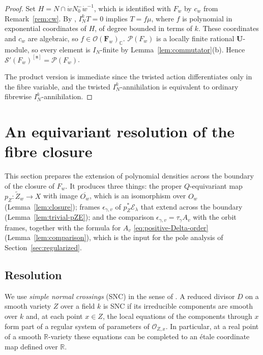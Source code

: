 \documentclass[a4paper,12pt]{amsart}
\numberwithin{equation}{section}
\theoremstyle{definition}
\theoremstyle{remark}
\newcommand{\U}{\mathbf U}
\newcommand{\F}{\mathbf F}
\newcommand{\R}{\mathbb R}
\newcommand{\C}{\mathbb C}
\newcommand{\fn}{\mathfrak n}
\newcommand{\IN}{I_N}
\newcommand{\mcS}{\mathcal S}
\newcommand{\mcE}{\mathcal E}
\newcommand{\mcP}{\mathcal P}
\begin{document}
\begin{proof}
Set $H=N\cap\dot wN_0^-\dot w^{-1}$, which is identified with $F_w$ by $c_w$ from Remark~\ref{rem:cw}. By \cite[Proposition~A.4]{Abe12}, $\IN^kT=0$ implies $T=f\mu$, where $f$ is polynomial in exponential coordinates of $H$, of degree bounded in terms of $k$. These coordinates and $c_w$ are algebraic, so $f\in\mathcal O(\F_w)_\C$.
$\mcP(F_w)$ is a locally finite rational $\U$-module, so every element is $\IN$-finite by Lemma~\ref{lem:commutator}(b). Hence $\mcS'(F_w)^{[\fn]}=\mcP(F_w)$.

The product version is immediate since the twisted action differentiates only in the fibre variable, and the twisted $\IN^k$-annihilation is equivalent to ordinary fibrewise $\IN^k$-annihilation.
\end{proof}

\section{An equivariant resolution of the fibre closure}\label{sec:resolution}

This section prepares the extension of polynomial densities across the boundary of the closure of $F_w$. It produces three things: the proper $Q$-equivariant map $p_Z:\tilde Z_w\to X$ with image $\overline{O_w}$, which is an isomorphism over $O_w$ (Lemma~\ref{lem:closure}); frames $\epsilon_{\gamma,v}$ of $p_Z^*\mcE_\lambda$ that extend across the boundary (Lemma~\ref{lem:trivial-pZE}); and the comparison $\epsilon_{\gamma,v}=\tau_\gamma A_v$ with the orbit frames, together with the formula for $A_v$ \eqref{eq:positive-Delta-order} (Lemma~\ref{lem:comparison}), which is the input for the pole analysis of Section~\ref{sec:regularized}.

\subsection{Resolution}\label{ssec:resolution}

We use \emph{simple normal crossings} (SNC) in the sense of \cite[Definition~24]{Kol07}. A reduced divisor $D$ on a smooth variety $Z$ over a field $k$ is SNC if its irreducible components are smooth over $k$ and, at each point $x\in Z$, the local equations of the components through $x$ form part of a regular system of parameters of $\mathcal O_{Z,x}$. In particular, at a real point of a smooth $\R$-variety these equations can be completed to an \'etale coordinate map defined over $\R$.
\end{document}
